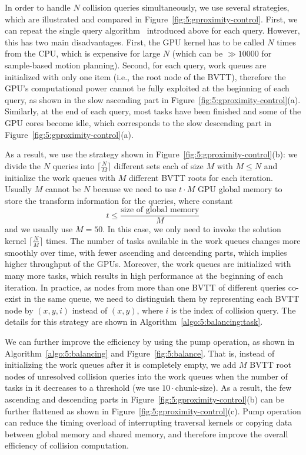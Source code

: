In order to handle $N$ collision queries simultaneously, we use several strategies, which are illustrated and compared in Figure~\ref{fig:5:gproximity-control}. First, we can repeat the single query algorithm~\cite{Lauterbach10} introduced above for each query. However, this has two main disadvantages. First, the GPU kernel has to be called $N$ times from the CPU, which is expensive for large $N$ (which can be $\gg 10000$ for sample-based motion planning). Second, for each query, work queues are initialized with only one item (i.e., the root node of the BVTT), therefore the GPU's computational power cannot be fully exploited at the beginning of each query, as shown in the slow ascending part in Figure~\ref{fig:5:gproximity-control}(a). Similarly, at the end of each query, most tasks have been finished and some of the GPU cores become idle, which corresponds to the slow descending part in Figure~\ref{fig:5:gproximity-control}(a).

As a result, we use the strategy shown in Figure~\ref{fig:5:gproximity-control}(b): we divide the $N$ queries into $\lceil\frac{N}{M}\rceil$ different sets each of size $M$ with $M\leq N$ and initialize the work queues with $M$ different BVTT roots for each iteration. Usually $M$ cannot be $N$ because we need to use $t \cdot M$ GPU global memory to store the transform information for the queries, where constant $$t \leq \frac{\text{size of global memory}}{M}$$ and we usually use $M=50$. In this case, we only need to invoke the solution kernel $\lceil\frac{N}{M}\rceil$ times. The number of tasks available in the work queues changes more smoothly over time, with fewer ascending and descending parts, which implies higher
throughput of the GPUs. Moreover, the work queues are initialized with many more tasks, which results in high performance at the beginning of each iteration. In practice, as nodes from more than one BVTT of different queries co-exist in the same queue, we need to distinguish them by representing each BVTT node by $(x,y,i)$ instead of $(x,y)$, where $i$ is the index of collision query. The details for this strategy are shown in Algorithm~\ref{algo:5:balancing:task}.

We can further improve the efficiency by using the pump operation, as shown in Algorithm~\ref{algo:5:balancing} and Figure~\ref{fig:5:balance}. That is, instead of initializing the work queues after it is completely empty, we add $M$ BVTT root nodes of unresolved collision queries into the work queues when the number of tasks in it decreases to a threshold (we use $10\cdot \text{chunk-size}$). As a result, the few ascending and descending parts in Figure~\ref{fig:5:gproximity-control}(b) can be further flattened as shown in Figure~\ref{fig:5:gproximity-control}(c). Pump operation can reduce the timing overload of interrupting traversal kernels or copying data between global memory and shared memory, and therefore improve the overall efficiency of collision computation.


